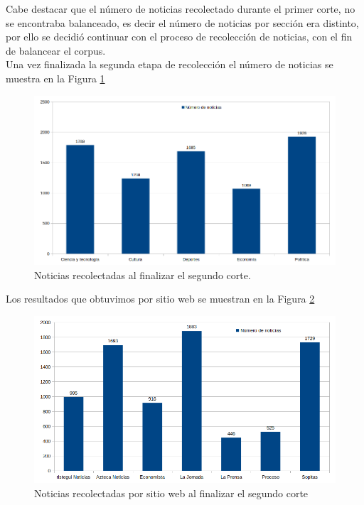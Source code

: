Cabe destacar que el número de noticias recolectado durante el primer corte, no se encontraba balanceado, es decir el número de noticias por sección era distinto, por ello se decidió continuar con el proceso de recolección de noticias, con el fin de balancear el corpus.\\
Una vez finalizada la segunda etapa de recolección el número de noticias se muestra en la Figura \ref{Fig:notseccion} 

\begin{figure}[H]
	\centering
	\includegraphics[scale=.42]{imagenes/Capitulo5/noticiasPorSeccionV2.png}
	\caption{Noticias recolectadas al finalizar el segundo corte.}
	\label{Fig:notseccion}
\end{figure}

Los resultados que obtuvimos por sitio web se muestran en la Figura \ref{Fig:notPorSit} 

\begin{figure}[H]
	\centering
	\includegraphics[scale=.47]{imagenes/Capitulo5/noticiasPorSitio.png}
	\caption{Noticias recolectadas por sitio web al finalizar el segundo corte}
	\label{Fig:notPorSit}
\end{figure}

